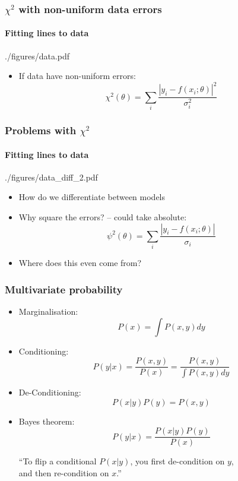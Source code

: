 \documentclass[%
]{beamer}
\begin{document}
\begin{frame}
    \frametitle{$\chi^2$ with non-uniform data errors}
    \framesubtitle{Fitting lines to data}
    \begin{figright}[0.4]{./figures/data.pdf}
        \begin{itemize}
            \item If data have non-uniform errors:
                \[
                    \chi^2(\theta) = \sum_i \frac{\left|y_i - f(x_i;\theta)\right|^2}{\sigma_i^2}
                \]
        \end{itemize}
    \end{figright}
\end{frame}

\begin{frame}
    \frametitle{Problems with $\chi^2$}
    \framesubtitle{Fitting lines to data}
    \begin{figright}[0.4]{./figures/data_diff_2.pdf}
        \begin{itemize}
            \item How do we differentiate between models
            \item Why square the errors? -- could take absolute:
                \[
                    \psi^2(\theta) = \sum_i \frac{\left|y_i - f(x_i;\theta)\right|}{\sigma_i}
                \]
            \item Where does this even come from?
        \end{itemize}
    \end{figright}
\end{frame}

\begin{frame}
    \frametitle{Multivariate probability}
    \begin{itemize}
        \item Marginalisation:
            \begin{equation*}
                P(x) = \int P(x,y) dy
            \end{equation*}
        \item Conditioning:
            \begin{equation*}
                P(y|x) = \frac{P(x,y)}{P(x)} = \frac{P(x,y)}{\int P(x,y) dy}
            \end{equation*}
        \item De-Conditioning:
            \begin{equation*}
                P(x|y) P(y) = P(x,y)
            \end{equation*}
        \item Bayes theorem:
            \begin{equation*}
                P(y|x) = \frac{P(x|y) P(y)}{P(x)}
            \end{equation*}
            \begin{center}
                ``To flip a conditional $P(x|y)$, you first de-condition on $y$,\\ and then re-condition on $x$.''
            \end{center}
    \end{itemize}
\end{frame}
\end{document}
